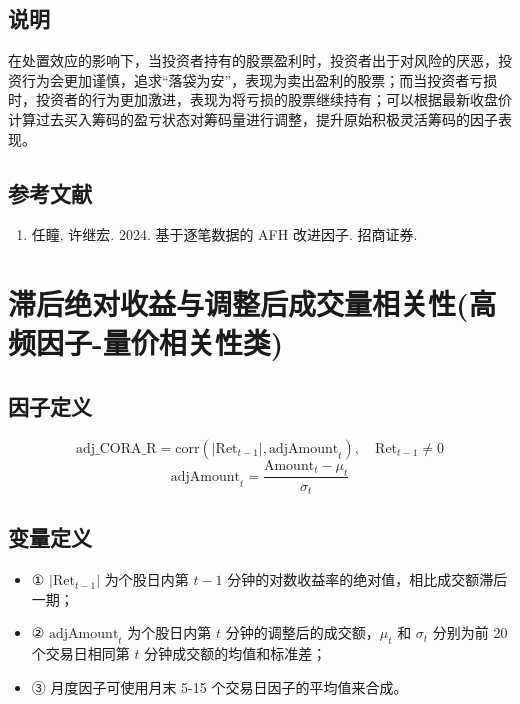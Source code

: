 \documentclass{article}
\begin{document}
\subsection{说明}
在处置效应的影响下，当投资者持有的股票盈利时，投资者出于对风险的厌恶，投资行为会更加谨慎，追求“落袋为安”，表现为卖出盈利的股票；而当投资者亏损时，投资者的行为更加激进，表现为将亏损的股票继续持有；可以根据最新收盘价计算过去买入筹码的盈亏状态对筹码量进行调整，提升原始积极灵活筹码的因子表现。

\subsection{参考文献}
\begin{enumerate}
    \item 任瞳, 许继宏. 2024. 基于逐笔数据的 AFH 改进因子. 招商证券.
\end{enumerate}

\section{滞后绝对收益与调整后成交量相关性(高频因子-量价相关性类)}

\subsection{因子定义}


\begin{equation}
    \mathrm{adj\_CORA\_R} = \mathrm{corr}(|\mathrm{Ret}_{t-1}|, \mathrm{adjAmount}_t), \quad \mathrm{Ret}_{t-1} \neq 0
\end{equation}
\begin{equation}
    \mathrm{adjAmount}_t = \frac{\mathrm{Amount}_t - \mu_t}{\sigma_t}
\end{equation}

\subsection{变量定义}
\begin{itemize}
    \item ① \( |\mathrm{Ret}_{t-1}| \) 为个股日内第 \( t-1 \) 分钟的对数收益率的绝对值，相比成交额滞后一期；
    \item ② \( \mathrm{adjAmount}_t \) 为个股日内第 \( t \) 分钟的调整后的成交额，\( \mu_t \) 和 \( \sigma_t \) 分别为前 20 个交易日相同第 \( t \) 分钟成交额的均值和标准差；
    \item ③ 月度因子可使用月末 5-15 个交易日因子的平均值来合成。
\end{itemize}
\end{document}
